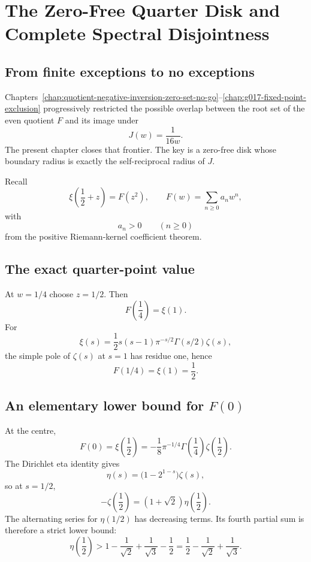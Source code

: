 \chapter{The Zero-Free Quarter Disk and Complete Spectral Disjointness}
\label{chap:g018-zero-free-quarter-disk}


\section{From finite exceptions to no exceptions}

Chapters~\ref{chap:quotient-negative-inversion-zero-set-no-go}--\ref{chap:g017-fixed-point-exclusion} progressively restricted the possible overlap between the root set of the even quotient $F$ and its image under
\[
 J(w)=\frac{1}{16w}.
\]
The present chapter closes that frontier.  The key is a zero-free disk whose boundary radius is exactly the self-reciprocal radius of $J$.

Recall
\[
 \xi\!\left(\frac12+z\right)=F(z^2),
 \qquad
 F(w)=\sum_{n\ge0}a_nw^n,
\]
with
\[
 a_n>0\qquad(n\ge0)
\]
from the positive Riemann-kernel coefficient theorem.

\section{The exact quarter-point value}

At $w=1/4$ choose $z=1/2$.  Then
\[
 F\!\left(\frac14\right)=\xi(1).
\]
For
\[
 \xi(s)=\frac12s(s-1)\pi^{-s/2}\Gamma(s/2)\zeta(s),
\]
the simple pole of $\zeta(s)$ at $s=1$ has residue one, hence
\begin{equation}
 \boxed{F(1/4)=\xi(1)=\frac12}.
 \label{eq:g018-quarter-value}
\end{equation}

\section{An elementary lower bound for $F(0)$}

At the centre,
\[
 F(0)=\xi\!\left(\frac12\right)
 =-\frac18\pi^{-1/4}\Gamma\!\left(\frac14\right)\zeta\!\left(\frac12\right).
\]
The Dirichlet eta identity gives
\[
 \eta(s)=\bigl(1-2^{1-s}\bigr)\zeta(s),
\]
so at $s=1/2$,
\[
 -\zeta\!\left(\frac12\right)
 =(1+\sqrt2)\eta\!\left(\frac12\right).
\]
The alternating series for $\eta(1/2)$ has decreasing terms.  Its fourth partial sum is therefore a strict lower bound:
\[
 \eta\!\left(\frac12\right)
 >
 1-\frac1{\sqrt2}+\frac1{\sqrt3}-\frac12
 =
 \frac12-\frac1{\sqrt2}+\frac1{\sqrt3}.
\]

